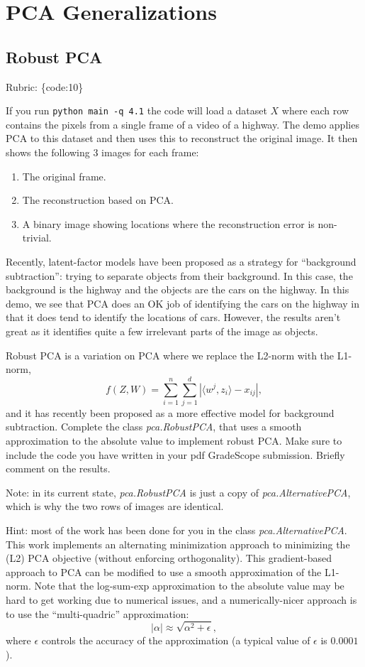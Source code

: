 \documentclass{article}
\def\rubric#1{\gre{Rubric: \{#1\}}}{}
\def\blu#1{{\color{blu}#1}}
\def\gre#1{{\color{gre}#1}}
\def\enum#1{\begin{enumerate}#1\end{enumerate}}
\begin{document}
\section{PCA Generalizations}

\subsection{Robust PCA}
\rubric{code:10}

If you run \verb|python main -q 4.1| the code will load a dataset $X$ where each row contains the pixels from a single frame of a video of a highway. The demo applies PCA to this dataset and then uses this to reconstruct the original image.
It then shows the following 3 images for each frame:
\enum{
\item The original frame.
\item The reconstruction based on PCA.
\item A binary image showing locations where the reconstruction error is non-trivial.
}
Recently, latent-factor models have been proposed as a strategy for ``background subtraction'': trying to separate objects from their background. In this case, the background is the highway and the objects are the cars on the highway. In this demo, we see that PCA does an OK job of identifying the cars on the highway in that it does tend to identify the locations of cars. However, the results aren't great as it identifies quite a few irrelevant parts of the image as objects.

Robust PCA is a variation on PCA where we replace the L2-norm with the L1-norm,
\[
f(Z,W) = \sum_{i=1}^n\sum_{j=1}^d |\langle w^j, z_i\rangle - x_{ij}|,
\]
and it has recently been proposed as a more effective model for background subtraction. \blu{Complete the class \emph{pca.RobustPCA},
that uses a smooth approximation to the absolute value to implement robust PCA. Make sure to include the code you have written in your pdf GradeScope submission. Briefly comment on the results.} 

Note: in its current state, \emph{pca.RobustPCA} is just a copy of \emph{pca.AlternativePCA}, which is why the two rows of images are identical.

Hint: most of the work has been done for you in the class \emph{pca.AlternativePCA}.
This work implements an alternating minimization approach to minimizing the (L2) PCA objective (without enforcing orthogonality). This gradient-based approach to PCA can be modified to use a smooth approximation of the L1-norm. Note that the log-sum-exp approximation to the absolute value may be hard to get working due to numerical issues, and a numerically-nicer approach is to use the ``multi-quadric'' approximation:
\[
|\alpha| \approx \sqrt{\alpha^2 + \epsilon},
\]
where $\epsilon$ controls the accuracy of the approximation (a typical value of $\epsilon$ is $0.0001$).
\end{document}
